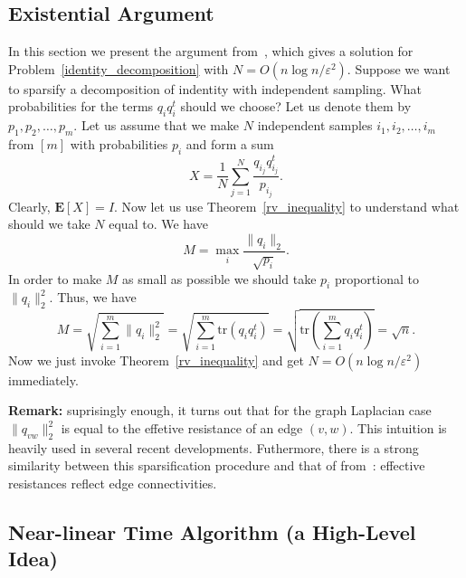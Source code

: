 \documentclass[12pt]{article}
\newcommand{\eps}{\varepsilon}
\begin{document}
    \subsection{Existential Argument}

    In this section we present the argument from~\cite{SS11}, which gives a solution
    for Problem~\ref{identity_decomposition} with $N = O(n \log n / \eps^2)$.
    Suppose we want to sparsify a decomposition of indentity with independent sampling.
    What probabilities for the terms $q_i q_i^t$ should we choose?
    Let us denote them by $p_1, p_2, \ldots, p_m$.
    Let us assume that we make $N$ independent samples $i_1, i_2, \ldots, i_m$
    from $[m]$ with probabilities $p_i$ and form a sum
    $$
        X = \frac{1}{N} \sum_{j=1}^N \frac{q_{i_j} q_{i_j}^t}{p_{i_j}}.
    $$
    Clearly, $\mathbf{E}[X] = I$. Now let us use Theorem~\ref{rv_inequality} to understand
    what should we take $N$ equal to. We have
    $$
        M = \max_i \frac{\|q_i\|_2}{\sqrt{p_i}}.
    $$
    In order to make $M$ as small as possible we should take $p_i$ proportional to
    $\|q_i\|_2^2$. Thus, we have
    $$
        M = \sqrt{\sum_{i=1}^m \|q_i\|_2^2} =
        \sqrt{\sum_{i=1}^m \mathrm{tr}(q_i q_i^t)} =
        \sqrt{\mathrm{tr}\left(\sum_{i=1}^m q_i q_i^t\right)} = \sqrt{n}.
    $$
    Now we just invoke Theorem~\ref{rv_inequality} and get $N = O(n \log n / \eps^2)$
    immediately.

    \textbf{Remark:} suprisingly enough, it turns out that for the graph Laplacian case
    $\|q_{vw}\|_2^2$ is equal to the effetive resistance of an edge $(v, w)$.
    This intuition is heavily used in several recent developments. Futhermore, there is a strong similarity between this
    sparsification procedure and that of from~\cite{BK96}: effective resistances reflect edge connectivities.

    \subsection{Near-linear Time Algorithm (a High-Level Idea)}
\end{document}
